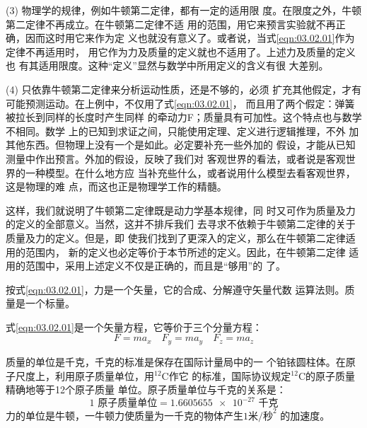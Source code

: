 \documentclass[../outline-of-mechanics.tex]{subfiles}
\begin{document}
(3) 物理学的规律，例如牛顿第二定律，都有一定的适用限
度。在限度之外，牛顿第二定律不再成立。在牛顿第二定律不适
用的范围，用它来预言实验就不再正确，因而这时用它来作为定
义也就没有意义了。或者说，当式\eqref{eqn:03.02.01}作为定律不再适用时，
用它作为力及质量的定义就也不适用了。上述力及质量的定义也
有其适用限度。这种“定义”显然与数学中所用定义的含义有很
大差别。

(4) 只依靠牛顿第二定律来分析运动性质，还是不够的，必须
扩充其他假定，才有可能预测运动。在上例中，不仅用了式\eqref{eqn:03.02.01}，
而且用了两个假定：弹簧被拉长到同样的长度时产生同样
的牵动力F；质量具有可加性。这个特点也与数学不相同。数学
上的已知到求证之间，只能使用定理、定义进行逻辑推理，不外
加其他东西。但物理上没有一个是如此。必定要补充一些外加的
假设，才能从已知测量中作出预言。外加的假设，反映了我们对
客观世界的看法，或者说是客观世界的一种模型。在什么地方应
当补充些什么，或者说用什么模型去看客观世界，这是物理的难
点，而这也正是物理学工作的精髓。

这样，我们就说明了牛顿第二定律既是动力学基本规律，同
时又可作为质量及力的定义的全部意义。当然，这并不排斥我们
去寻求不依赖于牛顿第二定律的关于质量及力的定义。但是，即
使我们找到了更深入的定义，那么在牛顿第二定律适用的范围内，
新的定义也必定等价于本节所述的定义。因此，在牛顿第二定律
适用的范围中，采用上述定义不仅是正确的，而且是“够用”的
了。

按式\eqref{eqn:03.02.01}，力是一个矢量，它的合成、分解遵守矢量代数
运算法则。质量是一个标量。

式\eqref{eqn:03.02.01}是一个矢量方程，它等价于三个分量方程：
\begin{equation*}
  F = m a _ { x } \quad F _ { y } = m a _ {y} \quad F _ { z } = m a_ { z }
\end{equation*}

质量的单位是千克，千克的标准是保存在国际计量局中的一
个铂铱圆柱体。在原子尺度上，利用原子质量单位，用$^{12}$C作它
的标准，国际协议规定$^{12}$C的原子质量精确地等于12个原子质量
单位。原子质量单位与千克的关系是：
\begin{equation*}
  1\text{ 原子质量单位} = \num{1.6605655e-27}\text{ 千克}
\end{equation*}
力的单位是牛顿，一牛顿力使质量为一千克的物体产生$1\text{米/秒}^2$
的加速度。
\end{document}
